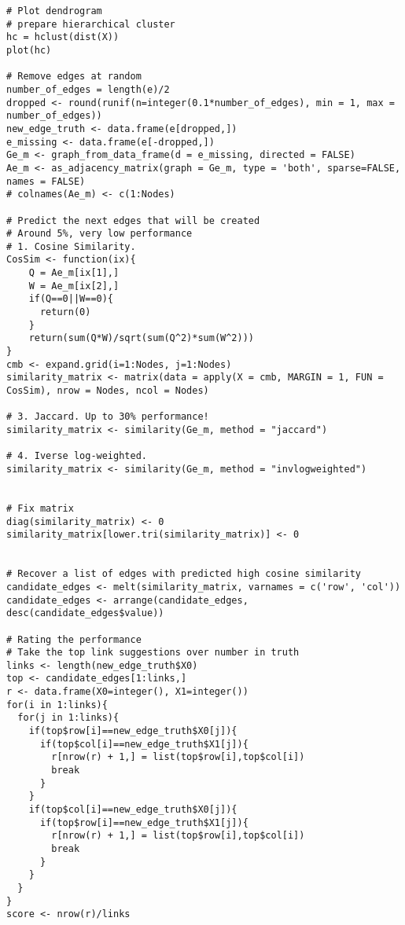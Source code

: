 \documentclass[12pt,a4paper]{report}
\begin{document}
\begin{lstlisting}
# Plot dendrogram
# prepare hierarchical cluster
hc = hclust(dist(X))
plot(hc)

# Remove edges at random
number_of_edges = length(e)/2
dropped <- round(runif(n=integer(0.1*number_of_edges), min = 1, max = number_of_edges))
new_edge_truth <- data.frame(e[dropped,])
e_missing <- data.frame(e[-dropped,])
Ge_m <- graph_from_data_frame(d = e_missing, directed = FALSE)
Ae_m <- as_adjacency_matrix(graph = Ge_m, type = 'both', sparse=FALSE, names = FALSE)
# colnames(Ae_m) <- c(1:Nodes)

# Predict the next edges that will be created
# Around 5%, very low performance
# 1. Cosine Similarity.                             
CosSim <- function(ix){
    Q = Ae_m[ix[1],]
    W = Ae_m[ix[2],]
    if(Q==0||W==0){
      return(0)
    }
    return(sum(Q*W)/sqrt(sum(Q^2)*sum(W^2)))
}   
cmb <- expand.grid(i=1:Nodes, j=1:Nodes)
similarity_matrix <- matrix(data = apply(X = cmb, MARGIN = 1, FUN = CosSim), nrow = Nodes, ncol = Nodes)

# 3. Jaccard. Up to 30% performance!
similarity_matrix <- similarity(Ge_m, method = "jaccard")

# 4. Iverse log-weighted. 
similarity_matrix <- similarity(Ge_m, method = "invlogweighted")


# Fix matrix
diag(similarity_matrix) <- 0
similarity_matrix[lower.tri(similarity_matrix)] <- 0


# Recover a list of edges with predicted high cosine similarity
candidate_edges <- melt(similarity_matrix, varnames = c('row', 'col'))
candidate_edges <- arrange(candidate_edges, desc(candidate_edges$value))

# Rating the performance
# Take the top link suggestions over number in truth
links <- length(new_edge_truth$X0)
top <- candidate_edges[1:links,]
r <- data.frame(X0=integer(), X1=integer())
for(i in 1:links){
  for(j in 1:links){
    if(top$row[i]==new_edge_truth$X0[j]){
      if(top$col[i]==new_edge_truth$X1[j]){
        r[nrow(r) + 1,] = list(top$row[i],top$col[i])
        break
      }
    }
    if(top$col[i]==new_edge_truth$X0[j]){
      if(top$row[i]==new_edge_truth$X1[j]){
        r[nrow(r) + 1,] = list(top$row[i],top$col[i])
        break
      }
    }
  }
}
score <- nrow(r)/links
\end{lstlisting}
\end{document}
